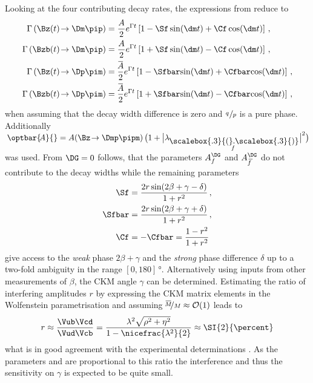 Looking at the four contributing decay rates, the expressions from  reduce to
\begin{align}
\Gamma\left(\Bz(t)\!\to\Dm\pip\right)&= \frac{A}{2}e^{\Gamma t}\left[1-\Sf\sin\!\left(\dm t\right)+\Cf\cos\!\left(\dm t\right)\right]\label{eq:DecRateB2Dmpip}\,,\\
\Gamma\left(\Bzb(t)\!\to\Dm\pip\right)&= \frac{A}{2}e^{\Gamma t}\left[1+\Sf\sin\!\left(\dm t\right)-\Cf\cos\!\left(\dm t\right)\right]\label{eq:DecRateBb2Dmpip}\,,\\
\Gamma\left(\Bz(t)\!\to\Dp\pim\right)&= \frac{\overline{\kern -1.0pt A\kern -1.0pt}}{2}e^{\Gamma t}\left[1-\Sfbar\!\sin\!\left(\dm t\right)+\Cfbar\!\cos\!\left(\dm t\right)\right]\label{eq:DecRateB2Dppim}\,,\\
\Gamma\left(\Bzb(t)\!\to\Dp\pim\right)&= \frac{\overline{\kern -1.0pt A\kern -1.0pt}}{2}e^{\Gamma t}\left[1+\Sfbar\!\sin\!\left(\dm t\right)-\Cfbar\!\cos\!\left(\dm t\right)\right]\label{eq:DecRateBb2Dppim}\,,
\end{align}
when assuming that the decay width difference \DG is zero and $\nicefrac{q\,}{p}$ is a pure phase.
Additionally $\kern 0.18em\optbar{\kern -0.18em A}{}=A\!\left(\Bz\!\to\Dmp\pipm\right)\big(1+\big|\lambda_{\kern -0.05em\shortstack{{\scalebox{.3}{(}\rule[.1ex]{0.25em}{.15mm}\scalebox{.3}{)}}\\ [-0.7ex]\kern -0.2em\scriptsize$f$}}\big|^2\big)$ was used.
From $\DG=0$ follows, that the parameters $A_f^{\DG}$ and $A_{\kern 1.5pt\overline{\kern -1.5pt f\kern 1.5pt}}^{\DG}$ do not contribute to the decay widths while the remaining \CP parameters
\begin{align}
\Sf&=\frac{2r\sin\!\left(2\beta+\gamma-\delta\right)}{1+r^2} \label{eq:DefSf}\,,\\
\Sfbar&=\frac{2r\sin\!\left(2\beta+\gamma+\delta\right)}{1+r^2} \label{eq:DefSfbar}\,,\\
\Cf&=-\Cfbar=\frac{1-r^2}{1+r^2}\label{eq:DefCf}
\end{align}
give access to the \emph{weak} phase $2\beta+\gamma$ and the \emph{strong} phase difference $\delta$ up to a two-fold ambiguity in the range $[0, 180]\,\si{\degree}$.
Alternatively using inputs from other measurements of $\beta$, the CKM angle $\gamma$ can be determined.
Estimating the ratio of interfering amplitudes $r$ by expressing the CKM matrix elements in the Wolfenstein parametrisation and assuming $\nicefrac{\overline{\kern -1.0pt M\kern -1.0pt}}{M}\approx\mathcal{O}\!\left(1\right)$ leads to
\begin{equation}
r\approx\frac{\Vub\Vcd}{\Vud\Vcb}=\frac{\lambda^2\sqrt{\rho^2+\eta^2}}{1-\nicefrac{\lambda^2}{2}}\approx\SI{2}{\percent} \label{eq:ratioDpi}
\end{equation}
what is in good agreement with the experimental determinations \cite{Das:2010be, Aubert:2008zi}.
As the parameters \Sf and \Sfbar are proportional to this ratio the interference and thus the sensitivity on $\gamma$ is expected to be quite small.

